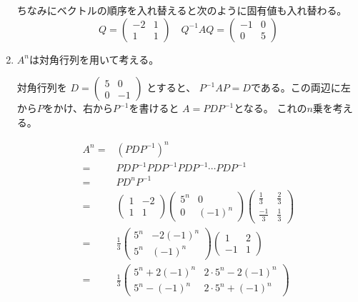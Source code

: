 \documentclass[12pt,b5paper]{ltjsarticle}
\begin{document}
\begin{enumerate}
      ちなみにベクトルの順序を入れ替えると次のように固有値も入れ替わる。
      \begin{equation}
       Q=\begin{pmatrix} -2 & 1 \\ 1 & 1 \end{pmatrix}
       \quad
        Q^{-1}AQ= \begin{pmatrix} -1 & 0 \\ 0 & 5 \end{pmatrix}
      \end{equation}

      \dotfill
 \item
      $A^n$は対角行列を用いて考える。

      対角行列を
      $D=\begin{pmatrix} 5 & 0 \\ 0 & -1 \end{pmatrix}$
      とすると、
      $P^{-1}AP=D$である。この両辺に左から$P$をかけ、右から$P^{-1}$を書けると
      $A=PDP^{-1}$となる。
      これの$n$乗を考える。

      \begin{align}
       A^n =& (PDP^{-1})^n\\ =& PDP^{-1}PDP^{-1}PDP^{-1}\cdots PDP^{-1}\\
        =& PD^nP^{-1}\\
        =& \begin{pmatrix} 1 & -2 \\ 1 & 1 \end{pmatrix}
       \begin{pmatrix} 5^n & 0 \\ 0 & (-1)^n \end{pmatrix}
       \begin{pmatrix}
        \frac{1}{3} & \frac{2}{3} \\
        \frac{-1}{3} & \frac{1}{3}
       \end{pmatrix}\\
       =& \frac{1}{3}\begin{pmatrix} 5^n & -2(-1)^n \\ 5^n & (-1)^n \end{pmatrix}\begin{pmatrix} 1 & 2 \\ -1 & 1 \end{pmatrix}\\
       =& \frac{1}{3}\begin{pmatrix} 5^n+2(-1)^n & 2\cdot 5^n-2(-1)^n \\ 5^n-(-1)^n & 2\cdot 5^n+(-1)^n \end{pmatrix}
      \end{align}


\end{enumerate}
\end{document}
